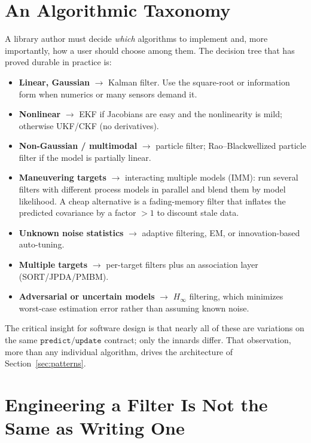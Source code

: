 \documentclass[10pt,conference]{IEEEtran}
\begin{document}
\section{An Algorithmic Taxonomy}
\label{sec:taxonomy}

A library author must decide \emph{which} algorithms to implement and, more
importantly, how a user should choose among them. The decision tree that has
proved durable in practice is:

\begin{itemize}
\item \textbf{Linear, Gaussian} $\rightarrow$ Kalman filter. Use the
square-root or information form when numerics or many sensors demand it.
\item \textbf{Nonlinear} $\rightarrow$ EKF if Jacobians are easy and the
nonlinearity is mild; otherwise UKF/CKF (no derivatives).
\item \textbf{Non-Gaussian / multimodal} $\rightarrow$ particle filter;
Rao--Blackwellized particle filter if the model is partially linear.
\item \textbf{Maneuvering targets} $\rightarrow$ interacting multiple models
(IMM): run several filters with different process models in parallel and
blend them by model likelihood. A cheap alternative is a fading-memory filter
that inflates the predicted covariance by a factor $>1$ to discount stale
data.
\item \textbf{Unknown noise statistics} $\rightarrow$ adaptive filtering,
EM, or innovation-based auto-tuning.
\item \textbf{Multiple targets} $\rightarrow$ per-target filters plus an
association layer (SORT/JPDA/PMBM).
\item \textbf{Adversarial or uncertain models} $\rightarrow$ $H_\infty$
filtering, which minimizes worst-case estimation error rather than assuming
known noise.
\end{itemize}

The critical insight for software design is that nearly all of these are
variations on the same $\texttt{predict}/\texttt{update}$ contract; only the
innards differ. That observation, more than any individual algorithm, drives
the architecture of Section~\ref{sec:patterns}.

\section{Engineering a Filter Is Not the Same as Writing One}
\label{sec:engineering}
\end{document}
